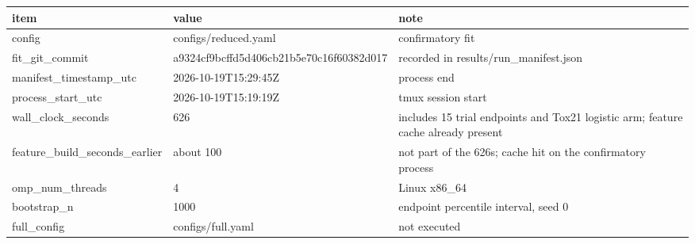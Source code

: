 \begin{tabular}{lll}
\hline
item & value & note \\
\hline
config & configs/reduced.yaml & confirmatory fit \\
fit\_git\_commit & a9324cf9bcffd5d406cb21b5e70c16f60382d017 & recorded in results/run\_manifest.json \\
manifest\_timestamp\_utc & 2026-10-19T15:29:45Z & process end \\
process\_start\_utc & 2026-10-19T15:19:19Z & tmux session start \\
wall\_clock\_seconds & 626 & includes 15 trial endpoints and Tox21 logistic arm; feature cache already present \\
feature\_build\_seconds\_earlier & about 100 & not part of the 626s; cache hit on the confirmatory process \\
omp\_num\_threads & 4 & Linux x86\_64 \\
bootstrap\_n & 1000 & endpoint percentile interval, seed 0 \\
full\_config & configs/full.yaml & not executed \\
\hline
\end{tabular}
